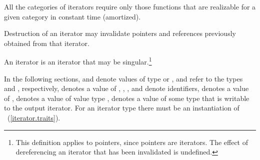 \pnum
All the categories of iterators require only those functions that are realizable for a given category in
constant time (amortized).

\pnum
Destruction of an iterator may invalidate pointers and references
previously obtained from that iterator.

\pnum
An
iterator is an iterator that may be singular.\footnote{This definition applies to pointers, since pointers are iterators.
The effect of dereferencing an iterator that has been invalidated
is undefined.
}

\pnum
In the following sections,
and
denote values of type
 or ,
 and  refer to the
types  and
, respectively,
denotes a value of
,
,
,
and
denote identifiers,
denotes a value of
,
denotes a value of value type
,
denotes a value of some type that is writable to the output iterator.
\enternote For an iterator type  there must be an instantiation
of ~(\ref{iterator.traits}). \exitnote

